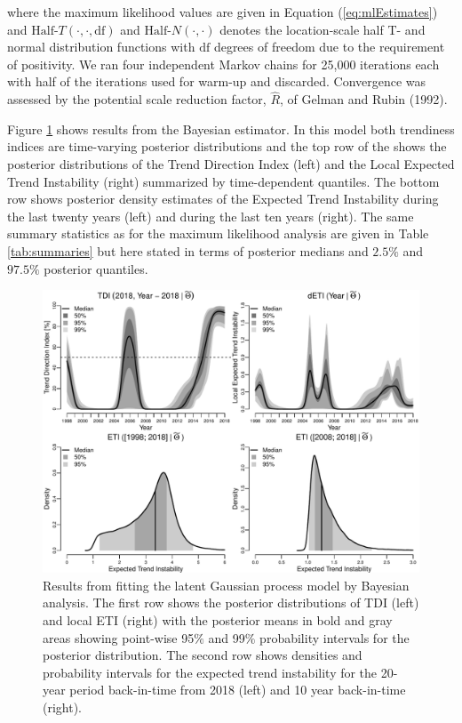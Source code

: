 \documentclass[11pt,]{article}
\theoremstyle{nonumberplain}
\begin{document}
where the maximum likelihood values are given in Equation
(\ref{eq:mlEstimates}) and \(\text{Half-}T(\cdot, \cdot, \mathrm{df})\)
and \(\text{Half-}N(\cdot, \cdot)\) denotes the location-scale half T-
and normal distribution functions with \(\mathrm{df}\) degrees of
freedom due to the requirement of positivity. We ran four independent
Markov chains for 25,000 iterations each with half of the iterations
used for warm-up and discarded. Convergence was assessed by the
potential scale reduction factor, \(\widehat{R}\), of Gelman and Rubin
(1992).

Figure \ref{fig:bayesFitPlot} shows results from the Bayesian estimator.
In this model both trendiness indices are time-varying posterior
distributions and the top row of the shows the posterior distributions
of the Trend Direction Index (left) and the Local Expected Trend
Instability (right) summarized by time-dependent quantiles. The bottom
row shows posterior density estimates of the Expected Trend Instability
during the last twenty years (left) and during the last ten years
(right). The same summary statistics as for the maximum likelihood
analysis are given in Table \ref{tab:summaries} but here stated in terms
of posterior medians and \(2.5\%\) and \(97.5\%\) posterior quantiles.

\begin{figure}[htb]
\center\includegraphics{bayesFitPlot}
\caption{Results from fitting the latent Gaussian process model by Bayesian analysis. The first row shows the posterior distributions of TDI (left) and local ETI (right) with the posterior means in bold and gray areas showing point-wise 95$\%$ and 99$\%$ probability intervals for the posterior distribution. The second row shows densities and probability intervals for the expected trend instability for the 20-year period back-in-time from 2018 (left) and 10 year back-in-time (right).}
\label{fig:bayesFitPlot}
\end{figure}
\end{document}
